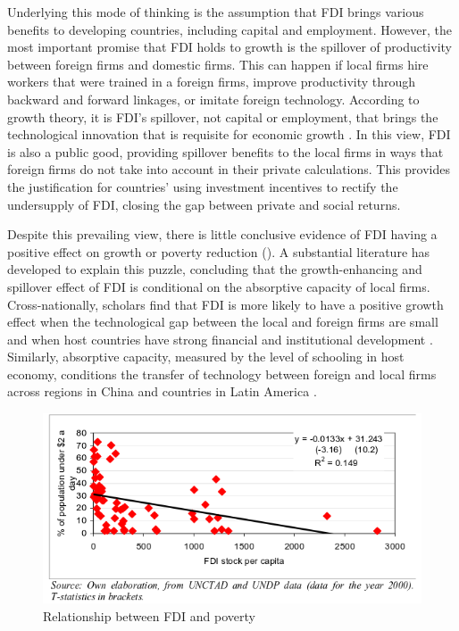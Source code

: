 \documentclass[12pt]{article}
\begin{document}
Underlying this mode of thinking is the assumption that FDI brings various benefits to developing countries, including capital and employment. However, the most important promise that FDI holds to growth is the spillover of productivity between foreign firms and domestic firms. This can happen if local firms hire workers that were trained in a foreign firms, improve productivity through backward and forward linkages, or imitate foreign technology. According to growth theory, it is FDI's spillover, not capital or employment, that brings the technological innovation that is requisite for economic growth \citep{Findlay1978}. In this view, FDI is also a public good, providing spillover benefits to the local firms in ways that foreign firms do not take into account in their private calculations. This provides the justification for countries' using investment incentives to rectify the undersupply of FDI, closing the gap between private and social returns. 

Despite this prevailing view, there is little conclusive evidence of FDI having a positive effect on growth \citep{Nair-Reichert2001, Carkovic2002} or poverty reduction \citep{Guerra2009} (). A substantial literature has developed to explain this puzzle, concluding that the growth-enhancing and spillover effect of FDI is conditional on the absorptive capacity of local firms. Cross-nationally, scholars find that FDI is more likely to have a positive growth effect when the technological gap between the local and foreign firms are small \citep{Nunnenkamp2004} and when host countries have strong financial and institutional development \citep{ Durham2004}. Similarly, absorptive capacity, measured by the level of schooling in host economy, conditions the transfer of technology between foreign and local firms across regions in China \citep{Fu2008} and countries in Latin America \citep{Willem2004}.

\begin{figure}[!ht]
\includegraphics[width=\textwidth, height=\textheight,keepaspectratio]{../figure/fdi_poverty}
\caption{Relationship between FDI and poverty}
\label{fig:fdipoverty}
\end{figure}
\end{document}
